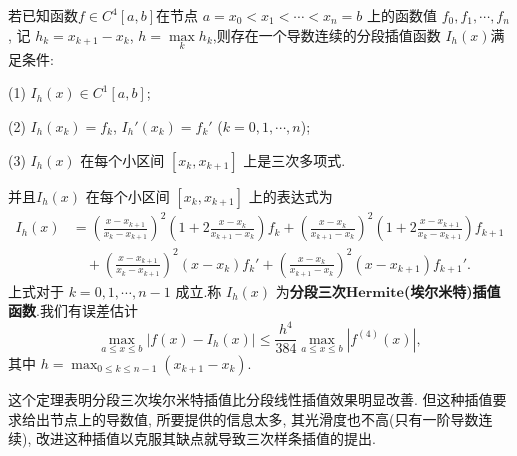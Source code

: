\documentclass[../../main.tex]{subfiles}
\begin{document}
\begin{theorem}
若已知函数$f\in C^4[a,b]$在节点 $a = x_0 < x_1 < \cdots < x_n = b$ 上的函数值 $f_0, f_1, \cdots, f_n$, 记 $h_k = x_{k + 1} - x_k$, $h = \max\limits_k h_k$,则存在一个导数连续的分段插值函数 $I_h(x)$满足条件:

(1) $I_h(x) \in C^1[a, b]$;

(2) $I_h(x_k) = f_k$, $I_h'(x_k) = f_k'$ ($k = 0, 1, \cdots, n$);

(3) $I_h(x)$ 在每个小区间 $[x_k, x_{k + 1}]$ 上是三次多项式.

并且$I_h(x)$ 在每个小区间 $[x_k, x_{k + 1}]$ 上的表达式为
\begin{align}
I_h(x) &= \left( \frac{x - x_{k + 1}}{x_k - x_{k + 1}} \right)^2 \left( 1 + 2 \frac{x - x_k}{x_{k + 1} - x_k} \right) f_k + \left( \frac{x - x_k}{x_{k + 1} - x_k} \right)^2 \left( 1 + 2 \frac{x - x_{k + 1}}{x_k - x_{k + 1}} \right) f_{k + 1} \nonumber \\
&\quad + \left( \frac{x - x_{k + 1}}{x_k - x_{k + 1}} \right)^2 (x - x_k) f_k' + \left( \frac{x - x_k}{x_{k + 1} - x_k} \right)^2 (x - x_{k + 1}) f_{k + 1}'. \label{5.3}
\end{align}
上式对于 $k = 0, 1, \cdots, n - 1$ 成立.称 $I_h(x)$ 为\textbf{分段三次}$\mathbf{Hermite}$\textbf{(埃尔米特)插值函数}.我们有误差估计
\[
\max_{a \leqslant x \leqslant b} | f(x) - I_h(x) | \leqslant \frac{h^4}{384} \max_{a \leqslant x \leqslant b} | f^{(4)}(x) |,
\]
其中 $h = \max_{0 \leqslant k \leqslant n - 1} (x_{k + 1} - x_k)$.
\end{theorem}
\begin{note}
这个定理表明分段三次埃尔米特插值比分段线性插值效果明显改善. 但这种插值要求给出节点上的导数值, 所要提供的信息太多, 其光滑度也不高(只有一阶导数连续), 改进这种插值以克服其缺点就导致三次样条插值的提出.
\end{note}
\end{document}
